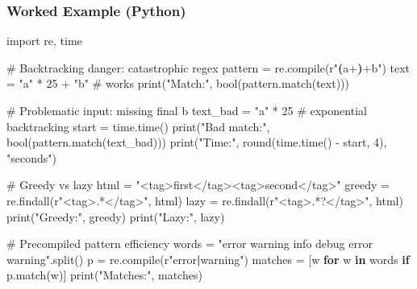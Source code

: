 \documentclass[
  letterpaper,
  DIV=11,
  numbers=noendperiod]{scrreprt}
\newenvironment{Shaded}{\begin{snugshade}}{\end{snugshade}}
\newcommand{\BuiltInTok}[1]{\textcolor[rgb]{0.00,0.23,0.31}{#1}}
\newcommand{\CommentTok}[1]{\textcolor[rgb]{0.37,0.37,0.37}{#1}}
\newcommand{\ControlFlowTok}[1]{\textcolor[rgb]{0.00,0.23,0.31}{\textbf{#1}}}
\newcommand{\DecValTok}[1]{\textcolor[rgb]{0.68,0.00,0.00}{#1}}
\newcommand{\ImportTok}[1]{\textcolor[rgb]{0.00,0.46,0.62}{#1}}
\newcommand{\KeywordTok}[1]{\textcolor[rgb]{0.00,0.23,0.31}{\textbf{#1}}}
\newcommand{\NormalTok}[1]{\textcolor[rgb]{0.00,0.23,0.31}{#1}}
\newcommand{\OperatorTok}[1]{\textcolor[rgb]{0.37,0.37,0.37}{#1}}
\newcommand{\StringTok}[1]{\textcolor[rgb]{0.13,0.47,0.30}{#1}}
\newcommand{\VerbatimStringTok}[1]{\textcolor[rgb]{0.13,0.47,0.30}{#1}}
\begin{document}
\subsubsection{Worked Example (Python)}\label{worked-example-python-15}

\begin{Shaded}
\begin{Highlighting}[]
\ImportTok{import}\NormalTok{ re, time}

\CommentTok{\# Backtracking danger: catastrophic regex}
\NormalTok{pattern }\OperatorTok{=}\NormalTok{ re.}\BuiltInTok{compile}\NormalTok{(}\VerbatimStringTok{r"}\KeywordTok{(}\VerbatimStringTok{a}\OperatorTok{+}\KeywordTok{)}\OperatorTok{+}\VerbatimStringTok{b"}\NormalTok{)}
\NormalTok{text }\OperatorTok{=} \StringTok{"a"} \OperatorTok{*} \DecValTok{25} \OperatorTok{+} \StringTok{"b"}   \CommentTok{\# works}
\BuiltInTok{print}\NormalTok{(}\StringTok{"Match:"}\NormalTok{, }\BuiltInTok{bool}\NormalTok{(pattern.match(text)))}

\CommentTok{\# Problematic input: missing final \textquotesingle{}b\textquotesingle{}}
\NormalTok{text\_bad }\OperatorTok{=} \StringTok{"a"} \OperatorTok{*} \DecValTok{25}     \CommentTok{\# exponential backtracking}
\NormalTok{start }\OperatorTok{=}\NormalTok{ time.time()}
\BuiltInTok{print}\NormalTok{(}\StringTok{"Bad match:"}\NormalTok{, }\BuiltInTok{bool}\NormalTok{(pattern.match(text\_bad)))}
\BuiltInTok{print}\NormalTok{(}\StringTok{"Time:"}\NormalTok{, }\BuiltInTok{round}\NormalTok{(time.time() }\OperatorTok{{-}}\NormalTok{ start, }\DecValTok{4}\NormalTok{), }\StringTok{"seconds"}\NormalTok{)}

\CommentTok{\# Greedy vs lazy}
\NormalTok{html }\OperatorTok{=} \StringTok{"\textless{}tag\textgreater{}first\textless{}/tag\textgreater{}\textless{}tag\textgreater{}second\textless{}/tag\textgreater{}"}
\NormalTok{greedy }\OperatorTok{=}\NormalTok{ re.findall(}\VerbatimStringTok{r"\textless{}tag\textgreater{}}\DecValTok{.}\OperatorTok{*}\VerbatimStringTok{\textless{}/tag\textgreater{}"}\NormalTok{, html)}
\NormalTok{lazy   }\OperatorTok{=}\NormalTok{ re.findall(}\VerbatimStringTok{r"\textless{}tag\textgreater{}}\DecValTok{.}\OperatorTok{*?}\VerbatimStringTok{\textless{}/tag\textgreater{}"}\NormalTok{, html)}
\BuiltInTok{print}\NormalTok{(}\StringTok{"Greedy:"}\NormalTok{, greedy)}
\BuiltInTok{print}\NormalTok{(}\StringTok{"Lazy:"}\NormalTok{, lazy)}

\CommentTok{\# Precompiled pattern efficiency}
\NormalTok{words }\OperatorTok{=} \StringTok{"error warning info debug error warning"}\NormalTok{.split()}
\NormalTok{p }\OperatorTok{=}\NormalTok{ re.}\BuiltInTok{compile}\NormalTok{(}\VerbatimStringTok{r"error}\ControlFlowTok{|}\VerbatimStringTok{warning"}\NormalTok{)}
\NormalTok{matches }\OperatorTok{=}\NormalTok{ [w }\ControlFlowTok{for}\NormalTok{ w }\KeywordTok{in}\NormalTok{ words }\ControlFlowTok{if}\NormalTok{ p.match(w)]}
\BuiltInTok{print}\NormalTok{(}\StringTok{"Matches:"}\NormalTok{, matches)}


\end{Highlighting}
\end{Shaded}
\end{document}
